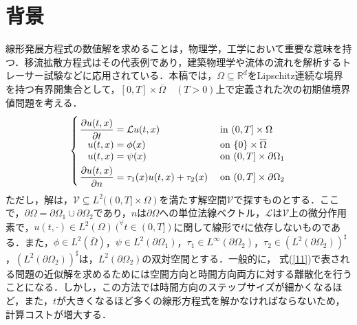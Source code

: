 \documentclass[a4paper,12pt]{nodlabpabw}
\def\D{\displaystyle}
\newcommand{\vsp}{\rule{0in}{.25in}}
\begin{document}
\section{背景}\label{chapint}
線形発展方程式の数値解を求めることは，物理学，工学において重要な意味を持つ．移流拡散方程式はその代表例であり，建築物理学や流体の流れを解析するトレーサー試験などに応用されている\cite{building,trace}．本稿では，$\Omega\subseteq\mathbb{R}^d$をLipschitz連続な境界を持つ有界開集合として，$[0,T]\times\overline{\Omega}\quad(T>0)$上で定義された次の初期値境界値問題を考える．
\begin{equation}\left\{\arraycolsep 0.14em\begin{array}{rcll}
\vsp\D\frac{\partial u(t,x)}{\partial t}&=&\mathcal{L}u(t,x)&\quad\mbox{in }(0,T]\times\Omega\\
u(t,x)&=&\phi(x)&\quad\mbox{on }\{0\}\times\overline{\Omega}\\
u(t,x)&=&\psi(x)&\quad\mbox{on }(0,T]\times\partial \Omega_1\\
\vsp\D\frac{\partial u(t,x)}{\partial n}&=&\tau_1(x)u(t,x)+\tau_2(x)&\quad\mbox{on }(0,T]\times\partial \Omega_2
\end{array}\right.\label{11}\end{equation}
ただし，解は，$\mathcal{V}\subseteq L^2((0,T]\times\Omega)$を満たす解空間$\mathcal{V}$で探すものとする．ここで，$\partial \Omega=\partial \Omega_1\cup\partial\Omega_2$であり，$n$は$\partial \Omega$への単位法線ベクトル，$\mathcal{L}$は$\mathcal{V}$上の微分作用素で，$u(t,\cdot)\in L^2(\Omega)\ (^{\forall} t\in(0,T])$に関して線形で$t$に依存しないものである．また，$\phi\in L^2(\overline{\Omega})$，$\psi\in L^2(\partial\Omega_1)$，$\tau_1\in L^{\infty}(\partial\Omega_2)$，$\tau_2\in (L^2(\partial\Omega_2))^{\sharp}$，$(L^2(\partial\Omega_2))^{\sharp}$は，$L^2(\partial\Omega_2)$の双対空間とする．一般的に，
式(\ref{11})で表される問題の近似解を求めるためには空間方向と時間方向両方に対する離散化を行うことになる\cite[pp.\ 22--27]{fem}．しかし，この方法では時間方向のステップサイズが細かくなるほど，また，$t$が大きくなるほど多くの線形方程式を解かなければならないため，計算コストが増大する．
\end{document}
